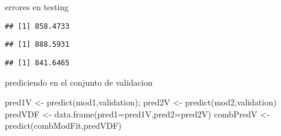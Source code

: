\documentclass[
]{article}
\newenvironment{Shaded}{\begin{snugshade}}{\end{snugshade}}
\newcommand{\AttributeTok}[1]{\textcolor[rgb]{0.77,0.63,0.00}{#1}}
\newcommand{\DecValTok}[1]{\textcolor[rgb]{0.00,0.00,0.81}{#1}}
\newcommand{\FunctionTok}[1]{\textcolor[rgb]{0.00,0.00,0.00}{#1}}
\newcommand{\NormalTok}[1]{#1}
\newcommand{\OtherTok}[1]{\textcolor[rgb]{0.56,0.35,0.01}{#1}}
\newcommand{\SpecialCharTok}[1]{\textcolor[rgb]{0.00,0.00,0.00}{#1}}
\begin{document}
errores en testing

\begin{Shaded}
\end{Shaded}

\begin{verbatim}
## [1] 858.4733
\end{verbatim}

\begin{Shaded}
\end{Shaded}

\begin{verbatim}
## [1] 888.5931
\end{verbatim}

\begin{Shaded}
\end{Shaded}

\begin{verbatim}
## [1] 841.6465
\end{verbatim}

prediciendo en el conjunto de validacion

\begin{Shaded}
\begin{Highlighting}[]
\NormalTok{pred1V }\OtherTok{\textless{}{-}} \FunctionTok{predict}\NormalTok{(mod1,validation); pred2V }\OtherTok{\textless{}{-}} \FunctionTok{predict}\NormalTok{(mod2,validation)}
\NormalTok{predVDF }\OtherTok{\textless{}{-}} \FunctionTok{data.frame}\NormalTok{(}\AttributeTok{pred1=}\NormalTok{pred1V,}\AttributeTok{pred2=}\NormalTok{pred2V)}
\NormalTok{combPredV }\OtherTok{\textless{}{-}} \FunctionTok{predict}\NormalTok{(combModFit,predVDF)}
\end{Highlighting}
\end{Shaded}
\end{document}
